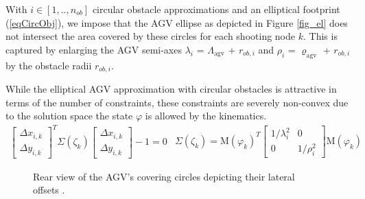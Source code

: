 With $i \in [1, .., n_{ob}]$ circular obstacle approximations and an elliptical footprint (\ref{eqCircObj}), we impose that the \ac{AGV} ellipse as depicted in Figure \ref{fig_el} does not intersect the area covered by these circles for each shooting node $k$. This is captured by enlarging the AGV semi-axes $\lambda_{i}$ = $\Lambda_{\mathrm{agv}}$ + $r_{ob, i}$ and $\rho_{i}$ = $\varrho_{\mathrm{agv}}$ + $r_{ob, i}$ by the obstacle radii $r_{ob, i}$.
\par While the elliptical AGV approximation with circular obstacles is attractive in terms of the number of constraints, these constraints are severely non-convex due to the solution space the state $\varphi$ is allowed by the kinematics. 
\begin{subequations}
\begin{align}
    \begin{bmatrix}
        \Delta x_{i, k}\\
        \Delta y_{i, k}
    \end{bmatrix}^T
    \Sigma(\zeta_{k})
    \begin{bmatrix}
        \Delta x_{i, k}\\
        \Delta y_{i, k}
    \end{bmatrix} - 1 = 0\label{eqCircObj}
\end{align}
\begin{align}\Sigma(\zeta_{k}) =     
    \mathrm{M}(\varphi_{k})^T
    \begin{bmatrix}
        1/\lambda^{2}_{i} & 0\\
        0 & 1/\rho^{2}_{i}
    \end{bmatrix}
    \mathrm{M}(\varphi_{k})
\end{align}
\end{subequations}

\begin{figure}[htbp]
    \begin{center}
        \def\svgwidth{0.65\textwidth}
        
        \caption{Rear view of the AGV's covering circles depicting their lateral offsets \cite{malitzky_markus_mechanical_nodate}.}
        \label{fig_3c}
    \end{center}
\end{figure}


